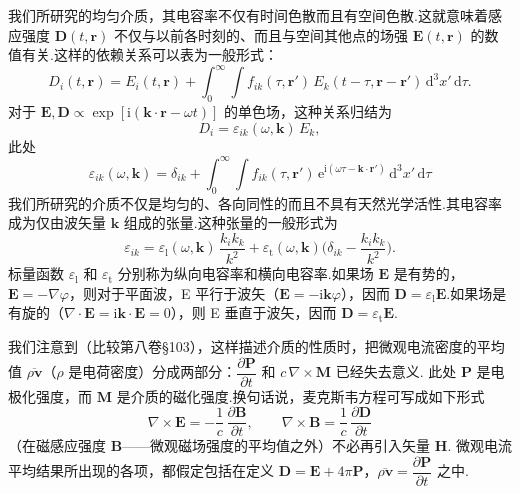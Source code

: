 我们所研究的均匀介质，其电容率不仅有时间色散而且有空间色散.这就意味着感应强度 $\bm{D}(t,\bm{r})$ 不仅与以前各时刻的、而且与空间其他点的场强 $\bm{E}(t,\bm{r})$ 的数值有关.这样的依赖关系可以表为一般形式：
\begin{equation}
  D_i(t,\bm{r})=E_i(t,\bm{r})+\int_{0}^{\infty}\!\!\int f_{ik}(\tau,\bm{r}')\,E_k(t-\tau,\bm{r}-\bm{r}')\,\mathrm{d}^{3}x'\,\mathrm{d}\tau.
\end{equation}
对于 $\bm{E},\bm{D}\propto\exp[\mathrm{i}(\bm{k}\cdot\bm{r}-\omega t)]$ 的单色场，这种关系归结为
\begin{equation}
  D_i=\varepsilon_{ik}(\omega,\bm{k})\,E_k,
\end{equation}
此处
\begin{equation}
  \varepsilon_{ik}(\omega,\bm{k})=\delta_{ik}+\int_{0}^{\infty}\!\!\int f_{ik}(\tau,\bm{r}')\,\mathrm{e}^{\mathrm{i}(\omega\tau-\bm{k}\cdot\bm{r}')}\,\mathrm{d}^{3}x'\,\mathrm{d}\tau
\end{equation}
我们所研究的介质不仅是均匀的、各向同性的而且不具有天然光学活性.其电容率成为仅由波矢量 $\bm{k}$ 组成的张量.这种张量的一般形式为
\begin{equation}
  \varepsilon_{ik}=\varepsilon_{\mathrm{l}}(\omega,\bm{k})\,\frac{k_i k_k}{k^{2}}+\varepsilon_{\mathrm{t}}(\omega,\bm{k})\biggl(\delta_{ik}-\frac{k_i k_k}{k^{2}}\biggr).
\end{equation}
标量函数 $\varepsilon_{\mathrm{l}}$ 和 $\varepsilon_{\mathrm{t}}$ 分别称为纵向电容率和横向电容率.如果场 $\bm{E}$ 是有势的，$\bm{E}=-\nabla\varphi$，则对于平面波，E 平行于波矢（$\bm{E}=-\mathrm{i}\bm{k}\varphi$），因而 $\bm{D}=\varepsilon_{\mathrm{l}}\bm{E}$.如果场是有旋的（$\nabla\cdot\bm{E}=\mathrm{i}\bm{k}\cdot\bm{E}=0$），则 E 垂直于波矢，因而 $\bm{D}=\varepsilon_{\mathrm{t}}\bm{E}$.

我们注意到（比较第八卷§103），这样描述介质的性质时，把微观电流密度的平均值 $\overline{\rho\bm{v}}$（$\rho$ 是电荷密度）分成两部分：$\dfrac{\partial\bm{P}}{\partial t}$ 和 $c\,\nabla\times\bm{M}$ 已经失去意义. 此处 $\bm{P}$ 是电极化强度，而 $\bm{M}$ 是介质的磁化强度.换句话说，麦克斯韦方程可写成如下形式
\begin{equation*}
  \nabla\times\bm{E}=-\frac{1}{c}\,\frac{\partial\bm{B}}{\partial t},\qquad \nabla\times\bm{B}=\frac{1}{c}\,\frac{\partial\bm{D}}{\partial t}
\end{equation*}
（在磁感应强度 $\bm{B}$——微观磁场强度的平均值之外）不必再引入矢量 $\bm{H}$. 微观电流平均结果所出现的各项，都假定包括在定义 $\bm{D}=\bm{E}+4\pi\bm{P}$，$\overline{\rho\bm{v}}=\dfrac{\partial\bm{P}}{\partial t}$ 之中.

